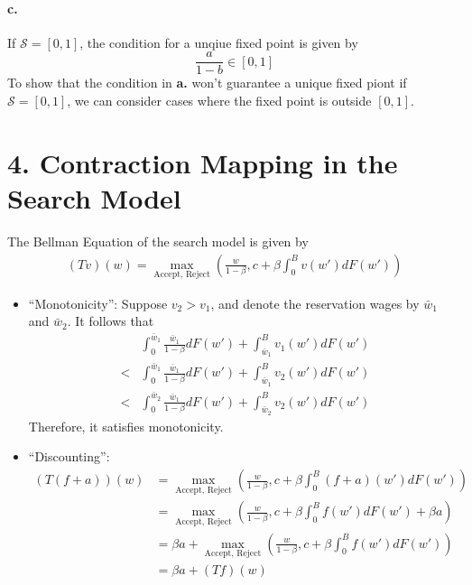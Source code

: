 \documentclass[11pt]{article}
\theoremstyle{definition}
\theoremstyle{boldtitle} %
\numberwithin{equation}{section}
\numberwithin{figure}{section}
\numberwithin{table}{section}
\begin{document}
\paragraph{c.} 
If $\mathcal{S} = [0, 1]$, the condition for a unqiue fixed point is given by 
\[
\frac{a}{1 - b} \in [0, 1]
\]
To show that the condition in \textbf{a.} won't guarantee a unique fixed piont if $\mathcal{S} = [0, 1]$,
we can consider cases where the fixed point is outside $[0, 1]$.




\section*{4. Contraction Mapping in the Search Model}
The Bellman Equation of the search model is given by 
\begin{align*}
(Tv)(w) = \max_{\text{Accept, Reject}} (\frac{w}{1 - \beta}, c + \beta \int_{0}^B v(w') dF(w'))
\end{align*}
\begin{itemize}
    \item ``Monotonicity'': Suppose $v_2 > v_1$, and denote the reservation wages by $\bar{w}_1$ and $\bar{w}_2$.
    It follows that 
    \begin{align*}
        & \int_{0}^{\bar{w}_1} \frac{\bar{w}_1}{1 - \beta} dF(w')  + \int_{\bar{w}_1}^B v_1(w') dF(w') \\
        < & \int_{0}^{\bar{w}_1} \frac{\bar{w}_1}{1 - \beta} dF(w')  + \int_{\bar{w}_1}^B v_2(w') dF(w') \\
        < & \int_{0}^{\bar{w}_2} \frac{\bar{w}_1}{1 - \beta} dF(w')  + \int_{\bar{w}_2}^B v_2(w') dF(w') 
    \end{align*}
    Therefore, it satisfies monotonicity.

    \item ``Discounting'': 
    \begin{align*} 
        (T(f+a))(w) & = \max_{\text{Accept, Reject}} (\frac{w}{1 - \beta}, c + \beta \int_{0}^B (f+a)(w') dF(w')) \\
        & = \max_{\text{Accept, Reject}} (\frac{w}{1 - \beta}, c + \beta \int_{0}^B f(w') dF(w')+ \beta a) \\
        & = \beta a + \max_{\text{Accept, Reject}} (\frac{w}{1 - \beta}, c + \beta \int_{0}^B f(w') dF(w')) \\
        & = \beta a + (Tf)(w)
    \end{align*}
\end{itemize}
\end{document}

